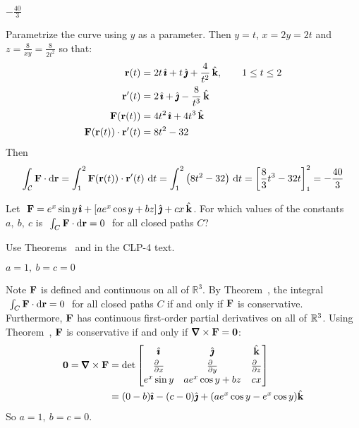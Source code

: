 \begin{answer}
$-\frac{40}{3}$
\end{answer}

\begin{solution} 
Parametrize the curve using $y$ as a parameter. Then $y=t$, $x=2y=2t$ and 
$z=\frac{8}{xy}=\frac{8}{2t^2}$ so that:
\begin{align*}
\mathbf{r}(t)&=2t\,\hat{\pmb{\imath}}+t\,\hat{\pmb{\jmath}}+\frac{4}{t^2}\,\hat{\mathbf{k}},\qquad 1\le t\le 2\\
\mathbf{r}'(t)&=2\,\hat{\pmb{\imath}}+\hat{\pmb{\jmath}}-\frac{8}{t^3}\,\hat{\mathbf{k}}\\
\mathbf{F}(\mathbf{r}(t))&= 4t^2\,\hat{\pmb{\imath}}+4t^3\,\hat{\mathbf{k}}\\
\mathbf{F}(\mathbf{r}(t))\cdot \mathbf{r}'(t)&=8t^2-32
\end{align*}
Then
$$
\int_{\mathcal{C}} \mathbf{F}\cdot \mathrm{d}\mathbf{r}
=\int_1^2 \mathbf{F}(\mathbf{r}(t))\cdot \mathbf{r}'(t)\ \mathrm{d}t
=\int_1^2 \big(8t^2-32\big)\ \mathrm{d}t
= \left[\frac{8}{3}t^3-32t\right]_1^2
=-\frac{40}{3}
$$

\end{solution}


\begin{question}[M317 2003A] %
Let $\ \mathbf{F}= e^x\sin y\,\hat{\pmb{\imath}}+[ae^x\cos y+bz]\,\hat{\pmb{\jmath}}+cx\,\hat{\mathbf{k}}$. 
For which values of the constants $a,\ b,\ c$ is 
$\ \int_C\mathbf{F}\cdot \mathrm{d}\mathbf{r}=0\ $ for all closed paths $C$?
\end{question}

\begin{hint} 
Use Theorems~ and  in the CLP-4 text.
\end{hint}

\begin{answer} 
$a=1,\ b=c=0$
\end{answer}

\begin{solution} 
Note $\mathbf{F}$ is defined and continuous on all of $\mathbb R^3$. By  Theorem~, the integral $\ \int_C\mathbf{F}\cdot \mathrm{d}\mathbf{r}=0\ $ for all closed paths $C$
if and only if $\mathbf{F}$ is conservative. Furthermore, $\mathbf{F}$ has continuous first-order partial derivatives on all of $\mathbb{R}^3$. Using Theorem~, $\mathbf{F}$ is conservative if
and only if $\vnabla\times\vF=\vZero$:
\begin{align*}
\vZero=\vnabla\times\vF
&=\det\left[\begin{matrix}\hi&\hj&\hk\\[0.03in] 
            \frac{\partial\hfill}{\partial x}&
            \frac{\partial\hfill}{\partial y}&
            \frac{\partial\hfill}{\partial z}\\[0.03in]
  e^x\sin y & ae^x\cos y+bz & cx\end{matrix}\right] \\
&=(0-b)\hi-(c-0)\hj+(ae^x\cos y-e^x\cos y)\hk
\end{align*}
So $a=1,\ b=c=0$.
\end{solution}

